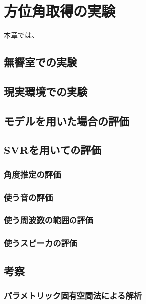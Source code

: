 \section{方位角取得の実験}
\label{chap:method}
本章では、

\subsection{無響室での実験}
\label{sec:dual_arms}

\subsection{現実環境での実験}
\label{sec:tactile}

\subsection{モデルを用いた場合の評価}
\label{sec:generate_pouring_motion}

\subsection{SVRを用いての評価}
\subsubsection{角度推定の評価}
\subsubsection{使う音の評価}
\subsubsection{使う周波数の範囲の評価}
\subsubsection{使うスピーカの評価}

\subsection{考察}
\subsubsection{パラメトリック固有空間法による解析}

\newpage
